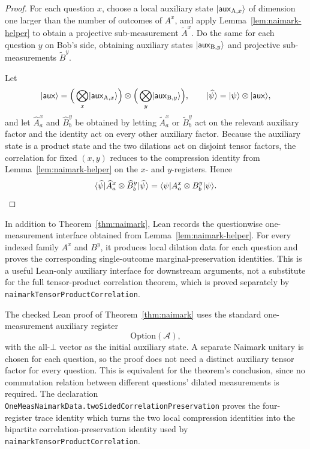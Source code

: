 \begin{proof}
	\leanok

	For each question $x$, choose a local auxiliary state
	$\lvert \mathsf{aux}_{\mathrm A,x} \rangle$ of dimension one larger than the number of
	outcomes of $A^x$, and apply Lemma~\ref{lem:naimark-helper} to obtain a
	projective sub-measurement $\widetilde A^x$. Do the same for each question $y$
	on Bob's side, obtaining auxiliary states $\lvert \mathsf{aux}_{\mathrm B,y} \rangle$
	and projective sub-measurements $\widetilde B^y$.

	Let
	\[
		\lvert \mathsf{aux} \rangle
		=
		\Big(\bigotimes_x \lvert \mathsf{aux}_{\mathrm A,x} \rangle\Big)
		\otimes
		\Big(\bigotimes_y \lvert \mathsf{aux}_{\mathrm B,y} \rangle\Big),
		\qquad
		\lvert \widehat{\psi} \rangle = \lvert \psi \rangle \otimes \lvert \mathsf{aux} \rangle,
	\]
	and let $\widehat A^x_a$ and $\widehat B^y_b$ be obtained by letting
	$\widetilde A^x_a$ or $\widetilde B^y_b$ act on the relevant auxiliary factor
	and the identity act on every other auxiliary factor. Because the auxiliary
	state is a product state and the two dilations act on disjoint tensor factors,
	the correlation for fixed $(x,y)$ reduces to the compression identity from
	Lemma~\ref{lem:naimark-helper} on the $x$- and $y$-registers. Hence
	\[
		\langle \widehat{\psi} \rvert \widehat A^x_a \otimes \widehat B^y_b \lvert \widehat{\psi} \rangle
		=
		\langle \psi \rvert A^x_a \otimes B^y_b \lvert \psi \rangle.
	\]
\end{proof}

\begin{remark}\label{rem:lean-questionwise-naimark}
	In addition to Theorem~\ref{thm:naimark}, Lean records the questionwise
	one-measurement interface obtained from Lemma~\ref{lem:naimark-helper}.  For
	every indexed family \(A^x\) and \(B^y\), it produces local dilation data for
	each question and proves the corresponding single-outcome
	marginal-preservation identities.  This is a useful Lean-only auxiliary
	interface for downstream arguments, not a substitute for the full
	tensor-product correlation theorem, which is proved separately by
	\texttt{naimarkTensorProductCorrelation}.
\end{remark}

\begin{remark}\label{rem:lean-naimark-auxiliary-declarations}
	The checked Lean proof of Theorem~\ref{thm:naimark} uses the standard
	one-measurement auxiliary register
	\[
		\mathrm{Option}(\mathcal A),
	\]
	with the all-\(\bot\) vector as the initial auxiliary state.  A separate
	Naimark unitary is chosen for each question, so the proof does not need a
	distinct auxiliary tensor factor for every question.  This is equivalent for
	the theorem's conclusion, since no commutation relation between different
	questions' dilated measurements is required.  The declaration
	\texttt{OneMeasNaimarkData.twoSidedCorrelationPreservation} proves the
	four-register trace identity which turns the two local compression identities
	into the bipartite correlation-preservation identity used by
	\texttt{naimarkTensorProductCorrelation}.
\end{remark}

